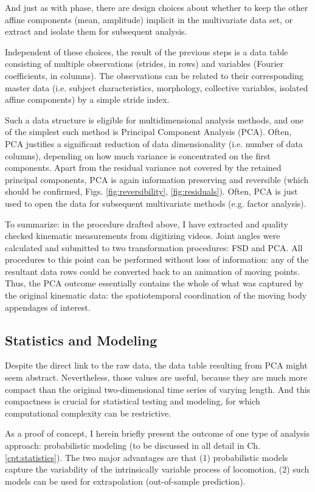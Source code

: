And just as with phase, there are design choices about whether to keep the other affine components (mean, amplitude) implicit in the multivariate data set, or extract and isolate them for subsequent analysis.


Independent of these choices, the result of the previous steps is a data table consisting of multiple observations (strides, in rows) and variables (Fourier coefficients, in columns).
The observations can be related to their corresponding master data (i.e. subject characteristics, morphology, collective variables, isolated affine components) by a simple stride index.

Such a data structure is eligible for multidimensional analysis methods, and one of the simplest such method is Principal Component Analysis (PCA).
Often, PCA justifies a significant reduction of data dimensionality (i.e. number of data columns), depending on how much variance is concentrated on the first components.
Apart from the residual variance not covered by the retained principal components, PCA is again information preserving and reversible (which should be confirmed, Figs. \ref{fig:reversibility}, \ref{fig:residuals}).
Often, PCA is just used to open the data for subsequent multivariate methods (e.g. factor analysis).


To summarize: in the procedure drafted above, I have extracted and quality checked kinematic measurements from digitizing videos.
Joint angles were calculated and submitted to two transformation procedures: FSD and PCA.
All procedures to this point can be performed without loss of information: any of the resultant data rows could be converted back to an animation of moving points.
Thus, the PCA outcome essentially contains the whole of what was captured by the original kinematic data: the spatiotemporal coordination of the moving body appendages of interest.


\subsection{Statistics and Modeling}
\label{sec:org8017e9e}
Despite the direct link to the raw data, the data table resulting from PCA might seem abstract.
Nevertheless, those values are useful, because they are much more compact than the original two-dimensional time series of varying length.
And this compactness is crucial for statistical testing and modeling, for which computational complexity can be restrictive.


As a proof of concept, I herein briefly present the outcome of one type of analysis approach: probabilistic modeling (to be discussed in all detail in Ch. \ref{cpt:statistics}).
The two major advantages are that (1) probabilistic models capture the variability of the intrinsically variable process of locomotion, (2) such models can be used for extrapolation (out-of-sample prediction).


